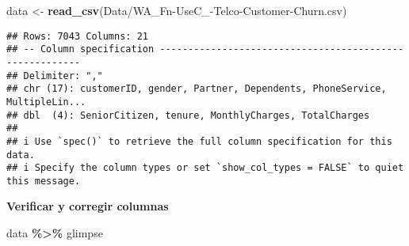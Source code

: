 \documentclass[
]{article}
\newenvironment{Shaded}{\begin{snugshade}}{\end{snugshade}}
\newcommand{\FunctionTok}[1]{\textcolor[rgb]{0.13,0.29,0.53}{\textbf{#1}}}
\newcommand{\NormalTok}[1]{#1}
\newcommand{\OtherTok}[1]{\textcolor[rgb]{0.56,0.35,0.01}{#1}}
\newcommand{\SpecialCharTok}[1]{\textcolor[rgb]{0.81,0.36,0.00}{\textbf{#1}}}
\newcommand{\StringTok}[1]{\textcolor[rgb]{0.31,0.60,0.02}{#1}}
\begin{document}
\begin{Shaded}
\begin{Highlighting}[]
\NormalTok{data }\OtherTok{\textless{}{-}} \FunctionTok{read\_csv}\NormalTok{(}\StringTok{\textquotesingle{}Data/WA\_Fn{-}UseC\_{-}Telco{-}Customer{-}Churn.csv\textquotesingle{}}\NormalTok{)}
\end{Highlighting}
\end{Shaded}

\begin{verbatim}
## Rows: 7043 Columns: 21
## -- Column specification --------------------------------------------------------
## Delimiter: ","
## chr (17): customerID, gender, Partner, Dependents, PhoneService, MultipleLin...
## dbl  (4): SeniorCitizen, tenure, MonthlyCharges, TotalCharges
## 
## i Use `spec()` to retrieve the full column specification for this data.
## i Specify the column types or set `show_col_types = FALSE` to quiet this message.
\end{verbatim}

\textbf{Verificar y corregir columnas}

\begin{Shaded}
\begin{Highlighting}[]
\NormalTok{data }\SpecialCharTok{\%\textgreater{}\%}\NormalTok{ glimpse}
\end{Highlighting}
\end{Shaded}
\end{document}
